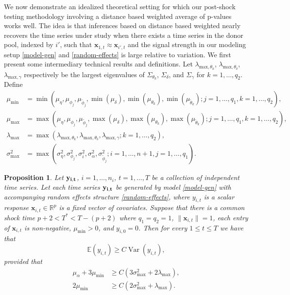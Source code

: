 \documentclass[11pt]{article}
\newcommand{\R}{\mathbb{R}}
\newcommand{\x}{\textbf{x}}
\def\E{\mathbb{E}} %
\DeclareMathOperator{\Var}{Var} %
\newtheorem{prop}{Proposition}
\theoremstyle{definition}
\begin{document}
\newpage

\vspace*{0.5cm} We now demonstrate an idealized theoretical setting for which our post-shock testing methodology involving a distance based weighted average of p-values works well. The idea is that inferences based on distance based weighted nearly recovers the time series under study when there exists a time series in the donor pool, indexed by $i'$, such that $\x_{1,t} \approx \x_{i',t}$ and the signal strength in our modeling setup \eqref{model-gen} and \eqref{random-effects} is large relative to variation. We first present some intermediary technical results and definitions. Let $\lambda_{\text{max},\theta_k}$, $\lambda_{\text{max},\theta_\delta}$, $\lambda_{\text{max},\gamma}$ respectively be the largest eigenvalues of $\Sigma_{\theta_k}$, $\Sigma_{\delta}$, and $\Sigma_{\gamma}$ for $k = 1,\ldots,q_2$. Define  
\begin{align*}
  \mu_{\min} &= \min\left(\mu_\eta,\mu_{\phi_j},\mu_{\tilde\phi_j},\min(\mu_\delta),\min(\mu_{\theta_k}),\min(\mu_{\tilde\theta_k}); j = 1,\ldots,q_1, k = 1,\ldots,q_2\right), \\
  \mu_{\max} &= \max\left(\mu_\eta,\mu_{\phi_j},\mu_{\tilde\phi_j},\max(\mu_\delta),\max(\mu_{\theta_k}),\max(\mu_{\tilde\theta_k}); j = 1,\ldots,q_1, k = 1,\ldots,q_2\right), \\
  \lambda_{\max} &= \max\left(\lambda_{\text{max},\theta_k}, \lambda_{\text{max},\theta_\delta}, \lambda_{\text{max},\gamma}; k = 1,\ldots,q_2\right), \\
  \sigma^2_{\max} &= \max\left(\sigma^2_{\eta},\sigma^2_{\phi_j},\sigma^2_i,\sigma^2_{\alpha},\sigma^2_{\tilde{\phi}_j}; i = 1,\ldots,n+1, j = 1,\ldots,q_1\right).  
\end{align*}



\begin{prop} \label{prop:signaltonoise}
  Let $\bf{y}_{i,t}$, $i = 1,\ldots,n_i$, $t = 1,\ldots, T$ be a collection of independent time series. Let each time series $\bf{y}_{i,t}$ be generated by model \eqref{model-gen} with accompanying random effects structure \eqref{random-effects}, where $y_{i,t}$ is a scalar response $\x_{i,t} \in \R^p$ is a fixed vector of covariates. Suppose that there is a common shock time $p + 2 < T^* < T - (p+2)$ where $q_1 = q_2 = 1$, $\|\x_{i,t}\| = 1$, each entry of $\x_{i,t}$ is non-negative, $\mu_{\min} > 0$, and $y_{i,0} = 0$. Then for every $1 \leq t \leq T$ we have that 
  \begin{equation} \label{signal-to-noise}
    \E(y_{i,t}) \geq C\Var(y_{i,t}),  
  \end{equation}
  provided that 
  \begin{equation} \label{condition-1}
  \begin{split}
    \mu_\alpha + 3\mu_{\min} &\geq C\left(3\sigma^2_{\max} + 2\lambda_{\max}\right), \\
    2\mu_{\min} &\geq C\left(2\sigma^2_{\max} + \lambda_{\max}\right).  
  \end{split}
  \end{equation}
\end{prop}
\end{document}
